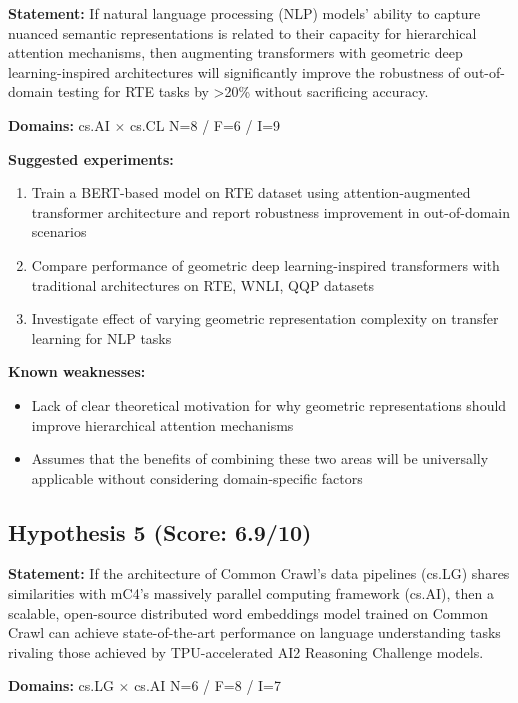 \documentclass[12pt,a4paper]{article}
\begin{document}
\textbf{Statement:} If natural language processing (NLP) models' ability to capture nuanced semantic representations is related to their capacity for hierarchical attention mechanisms, then augmenting transformers with geometric deep learning-inspired architectures will significantly improve the robustness of out-of-domain testing for RTE tasks by >20\% without sacrificing accuracy.

\noindent\textbf{Domains:} cs.AI $\times$ cs.CL
\hspace{1em} N=8 / F=6 / I=9

\textbf{Suggested experiments:}
\begin{enumerate}
  \item Train a BERT-based model on RTE dataset using attention-augmented transformer architecture and report robustness improvement in out-of-domain scenarios
  \item Compare performance of geometric deep learning-inspired transformers with traditional architectures on RTE, WNLI, QQP datasets
  \item Investigate effect of varying geometric representation complexity on transfer learning for NLP tasks
\end{enumerate}

\textbf{Known weaknesses:}
\begin{itemize}
  \item Lack of clear theoretical motivation for why geometric representations should improve hierarchical attention mechanisms
  \item Assumes that the benefits of combining these two areas will be universally applicable without considering domain-specific factors
\end{itemize}
\subsection*{Hypothesis 5 (Score: 6.9/10)}

\textbf{Statement:} If the architecture of Common Crawl's data pipelines (cs.LG) shares similarities with mC4's massively parallel computing framework (cs.AI), then a scalable, open-source distributed word embeddings model trained on Common Crawl can achieve state-of-the-art performance on language understanding tasks rivaling those achieved by TPU-accelerated AI2 Reasoning Challenge models.

\noindent\textbf{Domains:} cs.LG $\times$ cs.AI
\hspace{1em} N=6 / F=8 / I=7
\end{document}
